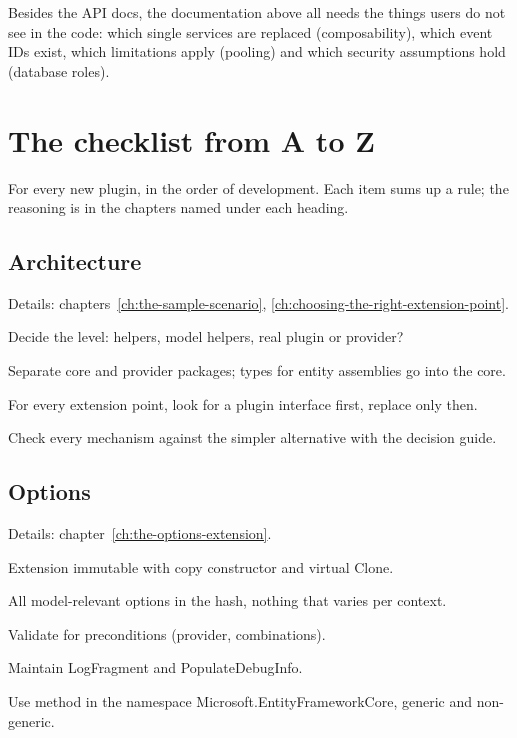 Besides the API docs, the documentation above all needs the things users do not see in the
code: which single services are replaced (composability), which event IDs exist, which
limitations apply (pooling) and which security assumptions hold (database roles).

\chapter{The checklist from A to Z}\label{ch:the-checklist-from-a-to}

For every new plugin, in the order of development. Each item sums up a rule; the reasoning is in the chapters named under each heading.

\section{Architecture}

\noindent Details: chapters~\ref{ch:the-sample-scenario}, \ref{ch:choosing-the-right-extension-point}.

\begin{checklist}
  \item Decide the level: helpers, model helpers, real plugin or provider?
  \item Separate core and provider packages; types for entity assemblies go into the core.
  \item For every extension point, look for a plugin interface first, replace only then.
  \item Check every mechanism against the simpler alternative with the decision guide.
\end{checklist}

\section{Options}

\noindent Details: chapter~\ref{ch:the-options-extension}.

\begin{checklist}
  \item Extension immutable with copy constructor and virtual Clone.
  \item All model-relevant options in the hash, nothing that varies per context.
  \item Validate for preconditions (provider, combinations).
  \item Maintain LogFragment and PopulateDebugInfo.
  \item Use method in the namespace Microsoft.EntityFrameworkCore, generic and non-generic.
\end{checklist}

